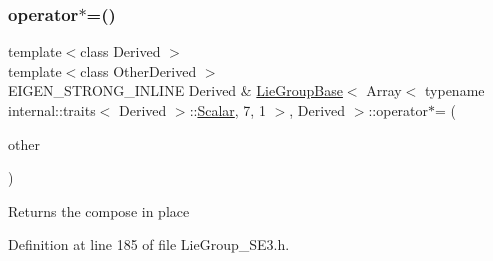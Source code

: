 \subsubsection{\texorpdfstring{operator$\ast$=()}{operator*=()}}
{\footnotesize\ttfamily template$<$class Derived $>$ \\
template$<$class Other\+Derived $>$ \\
E\+I\+G\+E\+N\+\_\+\+S\+T\+R\+O\+N\+G\+\_\+\+I\+N\+L\+I\+NE Derived \& \hyperlink{class_lie_group_base}{Lie\+Group\+Base}$<$ Array$<$ typename internal\+::traits$<$ Derived $>$\+::\hyperlink{class_lie_group_base_3_01_array_3_01typename_01internal_1_1traits_3_01_derived_01_4_1_1_scalar_0d6d4b5459662fc32c7117aee50362fb1_a831695c575380c9a1df32eff9fc4a8c6}{Scalar}, 7, 1 $>$, Derived $>$\+::operator$\ast$= (\begin{DoxyParamCaption}\item[{const \hyperlink{class_lie_group_base}{Lie\+Group\+Base}$<$ \hyperlink{class_lie_group_base_3_01_array_3_01typename_01internal_1_1traits_3_01_derived_01_4_1_1_scalar_0d6d4b5459662fc32c7117aee50362fb1_aadee14149cfa071338ac1f64e23c283d}{Base\+Type}, Other\+Derived $>$ \&}]{other }\end{DoxyParamCaption})}

\begin{DoxyReturn}{Returns}
the compose in place 
\end{DoxyReturn}


Definition at line 185 of file Lie\+Group\+\_\+\+S\+E3.\+h.

\hypertarget{class_lie_group_base_3_01_array_3_01typename_01internal_1_1traits_3_01_derived_01_4_1_1_scalar_0d6d4b5459662fc32c7117aee50362fb1_a8e98c7beac9a53cdc9b456057e01952d}{}\label{class_lie_group_base_3_01_array_3_01typename_01internal_1_1traits_3_01_derived_01_4_1_1_scalar_0d6d4b5459662fc32c7117aee50362fb1_a8e98c7beac9a53cdc9b456057e01952d} 
